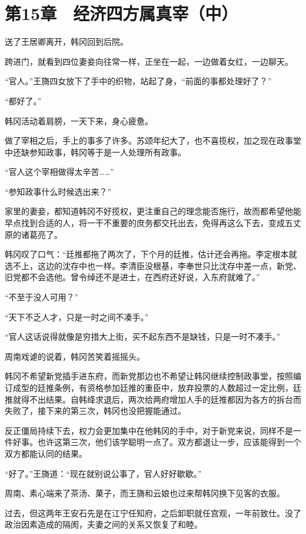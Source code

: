 \section{第15章　经济四方属真宰（中）}

送了王居卿离开，韩冈回到后院。

跨进门，就看到四位妻妾向往常一样，正坐在一起，一边做着女红，一边聊天。

“官人。”王旖四女放下了手中的织物，站起了身，“前面的事都处理好了？”

“都好了。”

韩冈活动着肩膀，一天下来，身心疲惫。

做了宰相之后，手上的事多了许多。苏颂年纪大了，也不喜揽权，加之现在政事堂中还缺参知政事，韩冈等于是一人处理所有政事。

“官人这个宰相做得太辛苦……”

“参知政事什么时候选出来？”

家里的妻妾，都知道韩冈不好揽权，更注重自己的理念能否施行，故而都希望他能早点找到合适的人，将一干不重要的庶务都交托出去，免得再这么下去，变成五丈原的诸葛亮了。

韩冈叹了口气：“廷推都拖了两次了，下个月的廷推，估计还会再拖。李定根本就选不上，这边的沈存中也一样。李清臣没根基，李奉世只比沈存中差一点，新党、旧党都不会选他。曾令绰还不是进士，在西府还好说，入东府就难了。”

“不至于没人可用？”

“天下不乏人才，只是一时之间不凑手。”

“官人这话说得就像是穷措大上街，买不起东西不是缺钱，只是一时不凑手。”

周南戏谑的说着，韩冈苦笑着摇摇头。

韩冈不希望新党插手进东府，而新党那边也不希望让韩冈继续控制政事堂，按照编订成型的廷推条例，有资格参加廷推的重臣中，放弃投票的人数超过一定比例，廷推就得不出结果。自韩绛求退后，两次给两府增加人手的廷推都因为各方的拆台而失败了，接下来的第三次，韩冈也没把握能通过。

反正僵局持续下去，权力会更加集中在他韩冈的手中，对于新党来说，同样不是一件好事。也许这第三次，他们该学聪明一点了。双方都退让一步，应该能得到一个双方都能认同的结果。

“好了。”王旖道：“现在就别说公事了，官人好好歇歇。”

周南、素心端来了茶汤、菓子，而王旖和云娘也过来帮韩冈换下见客的衣服。

过去，但这两年王安石先是在江宁任知府，之后卸职就任宫观，一年前致仕。没了政治因素造成的隔阂，夫妻之间的关系又恢复了和睦。

